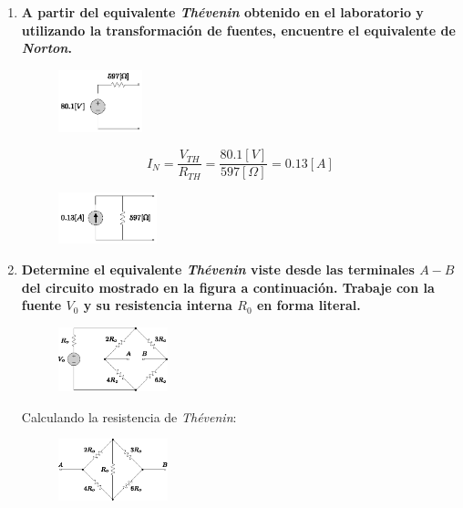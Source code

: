 \documentclass[letter,11pt]{article}
\begin{document}
\begin{enumerate}

\item \textbf{A partir del equivalente \emph{Thévenin} obtenido en el
laboratorio y utilizando la transformación de fuentes, encuentre el equivalente
de \emph{Norton}.} \\

\begin{figure}[!h]
\centering
\includegraphics[width=0.23\textwidth]{resources/figura1.eps}
\end{figure}

\begin{equation*}
    I_{N} = \frac{V_{TH}}{R_{TH}}
          = \frac{80.1 [V]}{597 [\Omega]}
          = 0.13 [A]
\end{equation*}

\begin{figure}[!h]
\centering
\includegraphics[width=0.27\textwidth]{resources/figura2.eps}
\end{figure}

\item \textbf{Determine el equivalente \emph{Thévenin} viste desde las
terminales $A-B$ del circuito mostrado en la figura a continuación. Trabaje con
la fuente $V_0$ y su resistencia interna $R_0$ en forma literal.}\\

\begin{figure}[!h]
\centering
\includegraphics[width=0.30\textwidth]{resources/figura3.eps}
\end{figure}

Calculando la resistencia de \emph{Thévenin}:

\begin{figure}[!h]
\centering
\includegraphics[width=0.30\textwidth]{resources/figura4.eps}
\end{figure}


\end{enumerate}
\end{document}

